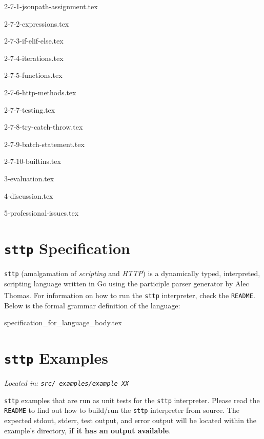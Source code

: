 \documentclass[]{full}
\theoremstyle{definition}
\begin{document}
{2-7-1-jsonpath-assignment.tex}

{2-7-2-expressions.tex}

{2-7-3-if-elif-else.tex}

{2-7-4-iterations.tex}

{2-7-5-functions.tex}

{2-7-6-http-methods.tex}

{2-7-7-testing.tex}

{2-7-8-try-catch-throw.tex}

{2-7-9-batch-statement.tex}

{2-7-10-builtins.tex}

{3-evaluation.tex}

{4-discussion.tex}

{5-professional-issues.tex}


\appendix

\cprotect\chapter{\verb|sttp| Specification}
\label{appendix:sttp-specification}

\verb|sttp| (amalgamation of \textit{scripting} and \textit{HTTP}) is a dynamically typed, interpreted, scripting language written in Go using the participle parser generator by Alec Thomas\textsuperscript{\cite{thomas_2021}}. For information on how to run the \verb|sttp| interpreter, check the \verb|README|. Below is the formal grammar definition of the language:

{specification_for_language_body.tex}

\cprotect\chapter{\verb|sttp| Examples}
\label{appendix:sttp-examples}

\cprotect\textit{Located in: \verb|src/_examples/example_XX|}

\verb|sttp| examples that are run as unit tests for the \verb|sttp| interpreter. Please read the \verb|README| to find out how to build/run the \verb|sttp| interpreter from source. The expected stdout, stderr, test output, and error output will be located within the example's directory, \textbf{if it has an output available}.
\end{document}
